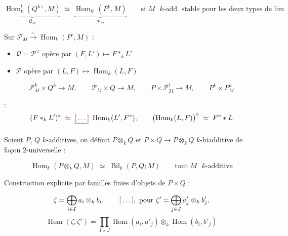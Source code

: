 \documentclass[11pt,a4paper]{article}
\begin{document}

\[
\underbrace{\operatorname{Hom}^{!}_{k}(Q^{k\circ}, M)}_{\textstyle \mathcal{Q}_M}
\;\simeq\;
\underbrace{\operatorname{Hom}_{k!}(P^{k}, M)}_{\textstyle \mathcal{P}_M}
\qquad \text{si $M$ $k$-add.\ stable pour les deux types de lim}
\]

Sur $\mathcal{P}_{M} \overset{\sim}{\longrightarrow}
\operatorname{Hom}_k(P^{\circ}, M)$ :

\begin{itemize}
  \item $\mathcal{Q} = \mathcal{P}^{\vee}$ opère par
    $(F, L') \mapsto F *_k L'$
  \item $\mathcal{P}$ opère par $(L, F) \mapsto \operatorname{Hom}_k(L, F)$
\end{itemize}


\[
\mathcal{P}^{k}_{M} \times Q^{k} \longrightarrow M,
\qquad
\mathcal{P}_M \times Q \longrightarrow M,
\qquad
P \times \mathcal{P}^{\dagger}_{M} \longrightarrow M,
\qquad
P^{k} \times P^{k}_{M}
\]


 :
\[
(F *_k L')^{\circ} \;\simeq\; \struck{\ill{}}\ \operatorname{Hom}_k(L', F^{\circ}),
\qquad
\bigl(\operatorname{Hom}_k(L, F)\bigr)^{\circ} \;\simeq\; F^{\circ} * L
\]



Soient $P$, $Q$ $k$-additives, on définit $P \otimes_k Q$ et
$P \times Q \to P \otimes_k Q$ $k$-biadditive de façon 2-universelle :

\[
\operatorname{Hom}_k(P \otimes_k Q, M) \;\simeq\; \operatorname{Bil}_k(P, Q; M)
\qquad \text{tout $M$ $k$-additive}
\]

Construction explicite par familles finies d'objets de $P \times Q$ :

\[
\zeta = \bigoplus_{i \in I} a_i \otimes_k b_i ,
\qquad \ill{},\ \text{pour } \zeta' = \bigoplus_{j \in J} a'_j \otimes_k b'_j ,
\]
\[
\operatorname{Hom}(\zeta, \zeta') = \prod_{I \times J}
\operatorname{Hom}(a_i, a'_j) \otimes_k \operatorname{Hom}(b_i, b'_j)
\]
\end{document}

